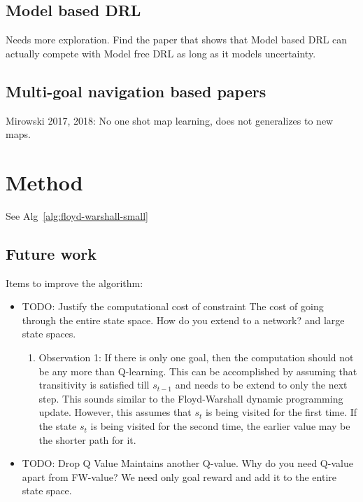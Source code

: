 \documentclass[letterpaper]{article} %
\newcommand{\TODO}[1]{{\color{red}TODO: {#1}}}
\def\state{s}
\begin{document}
\subsection{Model based DRL}
Needs more exploration.
Find the paper that shows that Model based DRL can actually compete with Model free DRL as long as it models uncertainty.

\subsection{Multi-goal navigation based papers}
Mirowski 2017, 2018: No one shot map learning, does not generalizes to new maps.


\section{Method}

See Alg~\ref{alg:floyd-warshall-small}

\subsection{Future work}
Items to improve the algorithm:
\begin{itemize} \item
\TODO{Justify the computational cost of constraint} The cost of going through the entire state space.
How do you extend to a network? and large state spaces.
\begin{enumerate}\item
Observation 1: If there is only one goal, then the computation should not be any more than Q-learning.
This can be accomplished by assuming that transitivity is satisfied till
$\state_{t-1}$ and needs to be extend to only the next step. This sounds similar to the
 Floyd-Warshall dynamic programming update.
However, this assumes that $\state_t$ is being visited for the first time.
If the state $\state_t$ is being visited for the second time, the earlier
value may be the shorter path for it.
\end{enumerate}
\item
\TODO{Drop Q Value} Maintains another Q-value. Why do you need Q-value apart from FW-value?
We need only goal reward and add it to the entire state space.
\end{itemize}
\end{document}
